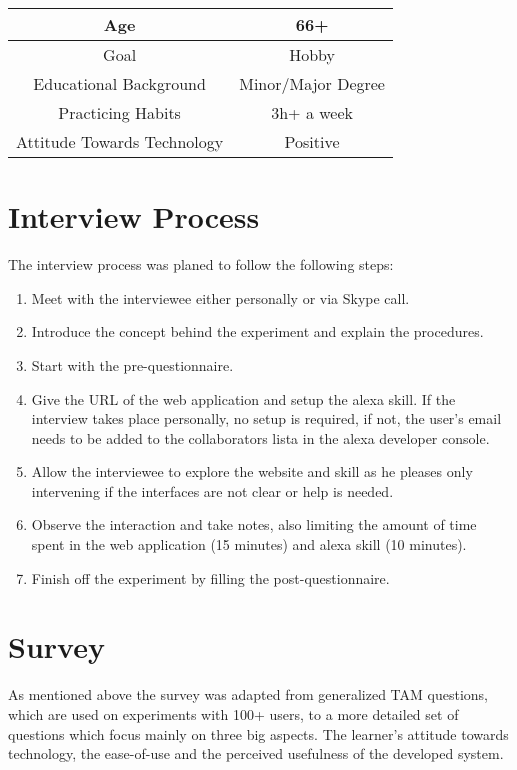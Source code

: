 \begin{center}
	\begin{tabular}{ | c | c | }
	\hline
		Age & 66+ \\
	\hline
		Goal & Hobby \\
	\hline
		Educational Background & Minor/Major Degree \\
	\hline
		Practicing Habits & 3h+ a week \\
	\hline
		Attitude Towards Technology & Positive \\
	\hline

	\end{tabular}
\end{center}


\section{Interview Process}
The interview process was planed to follow the following steps:

\begin{enumerate}
    \item Meet with the interviewee either personally or via Skype call.
    \item Introduce the concept behind the experiment and explain the procedures.
    \item Start with the pre-questionnaire. 
    \item Give the URL of the web application and setup the alexa skill. If the interview
        takes place personally, no setup is required, if not, the user's email needs to be
        added to the collaborators lista in the alexa developer console.
    \item Allow the interviewee to explore the website and skill as he pleases only intervening 
        if the interfaces are not clear or help is needed.
    \item Observe the interaction and take notes, also limiting the amount of time spent in the
        web application (15 minutes) and alexa skill (10 minutes).
    \item Finish off the experiment by filling the post-questionnaire.
\end{enumerate}

 
\section{Survey}

As mentioned above the survey was adapted from generalized 
TAM questions, which are used on experiments with 100+ users, to a more detailed
set of questions which focus mainly on three big aspects. The learner's 
attitude towards technology, the ease-of-use and the perceived usefulness of
the developed system.

